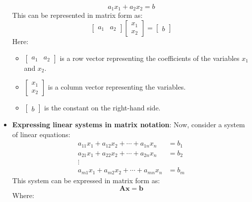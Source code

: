 \documentclass{report}
\begin{document}
\begin{itemize}
             \[
                 a_1x_1 + a_2x_2 = b
             \]
             This can be represented in matrix form as:
             \[
                 \begin{bmatrix}
                     a_1 & a_2
                 \end{bmatrix}
                 \begin{bmatrix}
                     x_1 \\
                     x_2
                 \end{bmatrix}
                 =
                 \begin{bmatrix}
                     b
                 \end{bmatrix}
             \]
             Here:
             \begin{itemize}
                 \item \(\begin{bmatrix} a_1 & a_2 \end{bmatrix}\) is a row vector representing the coefficients of the variables \(x_1\) and \(x_2\).
                 \item \(\begin{bmatrix} x_1 \\ x_2 \end{bmatrix}\) is a column vector representing the variables.
                 \item \(\begin{bmatrix} b \end{bmatrix}\) is the constant on the right-hand side.
             \end{itemize}
         \item \textbf{Expressing linear systems in matrix notation}:
             Now, consider a system of linear equations:
             \[
                 \begin{aligned}
                     a_{11}x_1 + a_{12}x_2 + \cdots + a_{1n}x_n &= b_1 \\
                     a_{21}x_1 + a_{22}x_2 + \cdots + a_{2n}x_n &= b_2 \\
                     \vdots \\
                     a_{m1}x_1 + a_{m2}x_2 + \cdots + a_{mn}x_n &= b_m
                 \end{aligned}
             \]
             This system can be expressed in matrix form as:
             \[
                 \mathbf{A}\mathbf{x} = \mathbf{b}
             \]
             Where:
             \begin{itemize}

\end{itemize}
\end{itemize}
\end{document}
